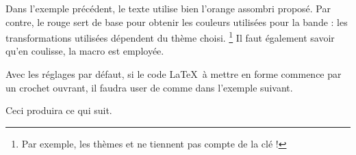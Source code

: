 \documentclass{tutodoc}
\begin{document}
\begin{tdocnote}
    Dans l'exemple précédent, le texte utilise bien l'orange assombri proposé. Par contre, le rouge sert de base pour obtenir les couleurs utilisées pour la bande : les transformations utilisées dépendent du thème choisi.%
    \footnote{
        Par exemple, les thèmes  et  ne tiennent pas compte de la clé  !
    }
    Il faut également savoir qu'en coulisse, la macro  est employée.

    \begin{tdoclatex}[std]
    \end{tdoclatex}
\end{tdocnote}


\begin{tdocwarn}
    Avec les réglages par défaut, si le code \LaTeX\ à mettre en forme commence par un crochet ouvrant, il faudra user de  comme dans l'exemple suivant.


    Ceci produira ce qui suit.
\end{tdocwarn}


\end{document}
